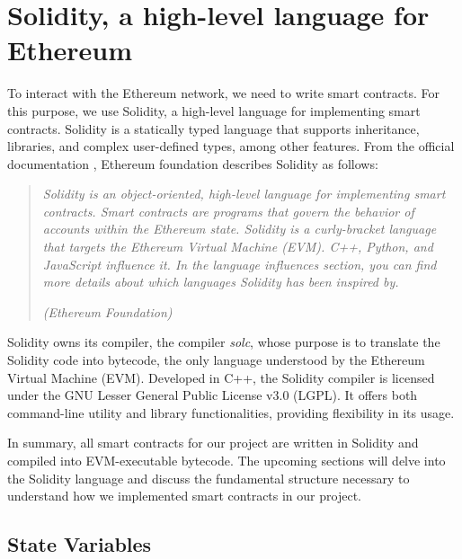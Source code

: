 

\section{Solidity, a high-level language for Ethereum}
\label{sec:ch2_solidity}


To interact with the Ethereum network, we need to write smart contracts. For this purpose, we use Solidity, a high-level language for
implementing smart contracts. Solidity is a statically typed language that supports inheritance, libraries, and complex user-defined types, among other features.
From the official documentation \cite{ethereum_solidity_doc}, Ethereum foundation describes Solidity as follows:


\begin{quote}
   \textit{Solidity is an object-oriented, high-level language for implementing smart contracts. Smart contracts are programs that govern the behavior of accounts within the Ethereum state.
       Solidity is a curly-bracket language that targets the Ethereum Virtual Machine (EVM). C++, Python, and JavaScript influence it. In the language influences section, you can find more details about which languages Solidity has been inspired by.}


   \textit{(Ethereum Foundation)}
\end{quote}


Solidity owns its compiler, the compiler \textit{solc}, whose purpose is to translate the Solidity code into bytecode, the only language understood by the Ethereum Virtual Machine (EVM). 
Developed in C++, the Solidity compiler is licensed under the GNU Lesser General Public License v3.0 (LGPL). It offers both command-line utility and library 
functionalities, providing flexibility in its usage.

In summary, all smart contracts for our project are written in Solidity and compiled into EVM-executable bytecode. The upcoming sections will delve into the Solidity 
language and discuss the fundamental structure necessary to understand how we implemented smart contracts in our project.


\subsection{State Variables}

